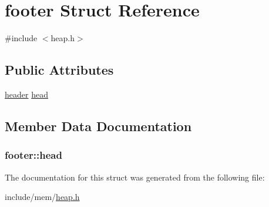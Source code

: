 \hypertarget{structfooter}{}\section{footer Struct Reference}
\label{structfooter}


{\ttfamily \#include $<$heap.\+h$>$}

\subsection*{Public Attributes}
\begin{DoxyCompactItemize}
\item 
\hyperlink{structheader}{header} \hyperlink{structfooter_acae33dac61c9505ff5b850f88d32dd0b}{head}
\end{DoxyCompactItemize}


\subsection{Member Data Documentation}
\hypertarget{structfooter_acae33dac61c9505ff5b850f88d32dd0b}{}
\subsubsection[{head}]{ footer\+::head}\label{structfooter_acae33dac61c9505ff5b850f88d32dd0b}


The documentation for this struct was generated from the following file\+:\begin{DoxyCompactItemize}
\item 
include/mem/\hyperlink{heap_8h}{heap.\+h}\end{DoxyCompactItemize}
